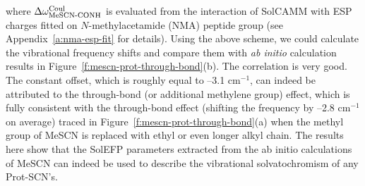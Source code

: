 \documentclass[a4paper,titlepage,twoside,fleqn,12pt]{book}
\begin{document}
\begin{refsection}
\begin{equation}
\end{equation}
%
where $\Delta\omega_{\text{MeSCN-CONH}}^{\rm Coul}$
is evaluated from the interaction of
SolCAMM with ESP charges fitted on $N$-methylacetamide
(NMA) peptide group (see Appendix~\ref{a:nma-esp-fit} for details). Using the above
scheme, we could calculate the vibrational frequency shifts
and compare them with \emph{ab initio} calculation results in Figure~\ref{f:mescn-prot-through-bond}(b). 
The correlation is very good. The constant offset, which is
roughly equal to --3.1 cm$^{-1}$, can indeed be attributed to the
through\hyp{}bond (or additional methylene group) effect, which is
fully consistent with the through\hyp{}bond effect (shifting the
frequency by --2.8 cm$^{-1}$ on average) traced 
in Figure~\ref{f:mescn-prot-through-bond}(a) when
the methyl group of MeSCN is replaced with ethyl or even
longer alkyl chain. The results here show that the SolEFP
parameters extracted from the ab initio calculations of MeSCN
can indeed be used to describe the vibrational
solvatochromism of any Prot-SCN's.


\end{refsection}
\end{document}
